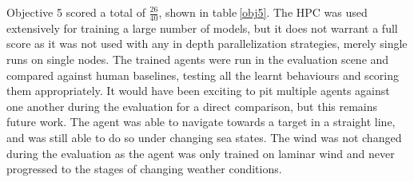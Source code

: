 \begin{table}[!htb]
    \centering
    \caption{Objective 5 Evaluation}\label{obj5}
\end{table}

Objective 5 scored a total of $\frac{26}{40}$, shown in table$~$\ref{obj5}. The HPC was used extensively for training a large number of models, but it does not warrant a full score as it was not used with any in depth parallelization strategies, merely single runs on single nodes. The trained agents were run in the evaluation scene and compared against human baselines, testing all the learnt behaviours and scoring them appropriately. It would have been exciting to pit multiple agents against one another during the evaluation for a direct comparison, but this remains future work. The agent was able to navigate towards a target in a straight line, and was still able to do so under changing sea states. The wind was not changed during the evaluation as the agent was only trained on laminar wind and never progressed to the stages of changing weather conditions.

